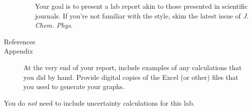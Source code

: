 \begin{description}
\begin{enumerate}
{		Your goal is to present a lab report akin to those presented in scientific journals. 
		If you're not familiar with the style, skim the latest issue of \emph{J. Chem. Phys.}}
	\end{enumerate}
	\item[References]
	\item[Appendix] At the very end of your report, include examples of any calculations that you did by hand. 
	Provide digital copies of the Excel (or other) files that you used to generate your graphs.
\end{description}

\noindent You do \emph{not} need to include uncertainty calculations for this lab. 

